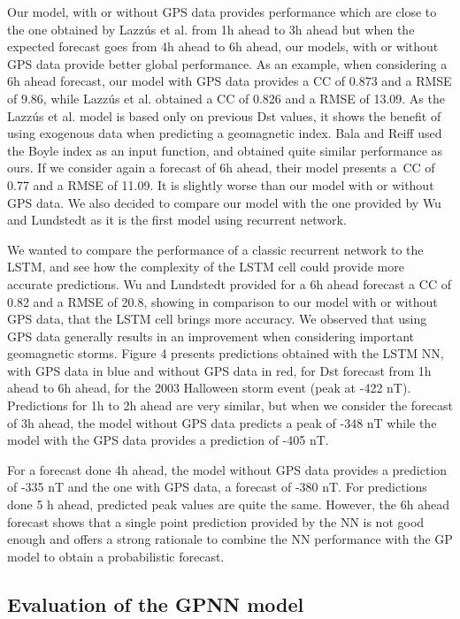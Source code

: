 Our model, with or without GPS data provides performance which are close to the one obtained by 
Lazzús et al. \cite{Lazzus} from 1h ahead to 3h ahead but when the expected forecast goes from 4h ahead to 6h ahead, 
our models, with or without GPS data provide better global performance. As an example, when considering a 6h 
ahead forecast, our model with GPS data provides a CC of 0.873 and a RMSE of 9.86, while Lazzús et al. \cite{Lazzus} 
obtained a CC of 0.826 and a RMSE of 13.09. As the Lazzús et al. \cite{Lazzus} model is based only on 
previous Dst values, it shows the benefit of using exogenous data when predicting a geomagnetic index. 
Bala and Reiff \cite{Bala2012} used the Boyle index as an input function, and obtained quite similar 
performance as ours. If we consider again a forecast of 6h ahead, their model presents a\ CC of 0.77 
and a RMSE of 11.09. It is slightly worse than our model with or without GPS data. We also decided to compare 
our model with the one provided by Wu and Lundstedt \cite{wu1997geomagnetic} as it is the first model using 
recurrent network. 

We wanted to compare the performance of a classic recurrent network to the LSTM, and see 
how the complexity of the LSTM cell could provide more accurate predictions. Wu and Lundstedt \cite{wu1997geomagnetic} 
provided for a 6h ahead forecast a CC of 0.82 and a RMSE of 20.8, showing in comparison to our model with or 
without GPS data, that the LSTM cell brings more accuracy. We observed that using GPS data generally results 
in an improvement when considering important geomagnetic storms. Figure 4 presents predictions obtained with 
the LSTM NN, with GPS data in blue and without GPS data in red, for Dst forecast from 1h ahead to 6h ahead, 
for the 2003 Halloween storm event (peak at -422 nT). Predictions for 1h to 2h ahead are very similar, but when 
we consider the forecast of 3h ahead, the model without GPS data predicts a peak of -348 nT while the model 
with the GPS data provides a prediction of -405 nT. 

For a forecast done 4h ahead, the model without GPS data 
provides a prediction of -335 nT and the one with GPS data, a forecast of -380 nT. For predictions done 5 h ahead, 
predicted peak values are quite the same. However, the 6h ahead forecast shows that a single point prediction 
provided by the NN is not good enough and offers a strong rationale to combine the NN performance with the 
GP model to obtain a probabilistic forecast. 


\subsection{Evaluation of the GPNN model}

